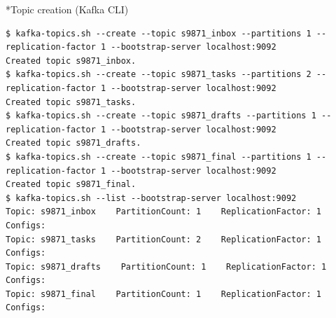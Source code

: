 \documentclass[11pt]{article}
\makeatletter
\renewcommand\subsection{\@startsection{subsection}{2}{\z@}{-2.2ex \@plus -1ex \@minus -.2ex}{0.8ex \@plus.2ex}{\normalfont\fontsize{12}{14.5}\selectfont\bfseries}}
\makeatother
\begin{document}
\subsection*{Topic creation (Kafka CLI)}
\begingroup\lstset{basicstyle=\ttfamily\tiny}
\begin{lstlisting}
$ kafka-topics.sh --create --topic s9871_inbox --partitions 1 --replication-factor 1 --bootstrap-server localhost:9092
Created topic s9871_inbox.
$ kafka-topics.sh --create --topic s9871_tasks --partitions 2 --replication-factor 1 --bootstrap-server localhost:9092
Created topic s9871_tasks.
$ kafka-topics.sh --create --topic s9871_drafts --partitions 1 --replication-factor 1 --bootstrap-server localhost:9092
Created topic s9871_drafts.
$ kafka-topics.sh --create --topic s9871_final --partitions 1 --replication-factor 1 --bootstrap-server localhost:9092
Created topic s9871_final.
$ kafka-topics.sh --list --bootstrap-server localhost:9092
Topic: s9871_inbox    PartitionCount: 1    ReplicationFactor: 1    Configs: 
Topic: s9871_tasks    PartitionCount: 2    ReplicationFactor: 1    Configs: 
Topic: s9871_drafts    PartitionCount: 1    ReplicationFactor: 1    Configs: 
Topic: s9871_final    PartitionCount: 1    ReplicationFactor: 1    Configs: 
\end{lstlisting}
\endgroup
\end{document}
